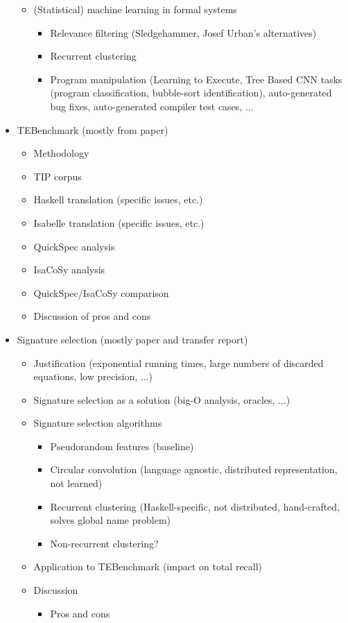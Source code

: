 \documentclass{article}
\begin{document}
\begin{itemize}
\begin{itemize}
\begin{itemize}
    \end{itemize}
  \item (Statistical) machine learning in formal systems
    \begin{itemize}
    \item Relevance filtering (Sledgehammer, Josef Urban's alternatives)
    \item Recurrent clustering
    \item Program manipulation (Learning to Execute, Tree Based CNN tasks
      (program classification, bubble-sort identification), auto-generated bug
      fixes, auto-generated compiler test cases, ...
    \end{itemize}
  \end{itemize}

\item TEBenchmark (mostly from paper)
  \begin{itemize}
    \item Methodology
    \item TIP corpus
    \item Haskell translation (specific issues, etc.)
    \item Isabelle translation (specific issues, etc.)
    \item QuickSpec analysis
    \item IsaCoSy analysis
    \item QuickSpec/IsaCoSy comparison
    \item Discussion of pros and cons
  \end{itemize}

\item Signature selection (mostly paper and transfer report)
  \begin{itemize}
  \item Justification (exponential running times, large numbers of discarded
    equations, low precision, ...)
  \item Signature selection as a solution (big-O analysis, oracles, ...)
  \item Signature selection algorithms
    \begin{itemize}
    \item Pseudorandom features (baseline)
    \item Circular convolution (language agnostic, distributed representation,
      not learned)
    \item Recurrent clustering (Haskell-specific, not distributed, hand-crafted,
      solves global name problem)
    \item Non-recurrent clustering?
    \end{itemize}
  \item Application to TEBenchmark (impact on total recall)
  \item Discussion
    \begin{itemize}
    \item Pros and cons
    \end{itemize}
  \end{itemize}


\end{itemize}
\end{document}
